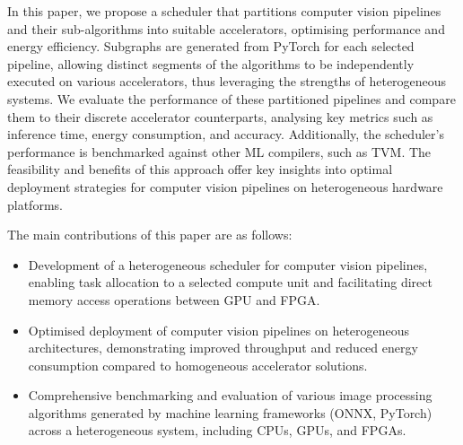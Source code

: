 \documentclass[]{spie}  %
\begin{document}
In this paper, we propose a scheduler that partitions computer vision pipelines and their sub-algorithms into suitable accelerators, optimising performance and energy efficiency. Subgraphs are generated from PyTorch for each selected pipeline, allowing distinct segments of the algorithms to be independently executed on various accelerators, thus leveraging the strengths of heterogeneous systems. We evaluate the performance of these partitioned pipelines and compare them to their discrete accelerator counterparts, analysing key metrics such as inference time, energy consumption, and accuracy. Additionally, the scheduler's performance is benchmarked against other ML compilers, such as TVM. The feasibility and benefits of this approach offer key insights into optimal deployment strategies for computer vision pipelines on heterogeneous hardware platforms.




The main contributions of this paper are as follows:
\begin{itemize}
\item Development of a heterogeneous scheduler for computer vision pipelines, enabling task allocation to a selected compute unit and facilitating direct memory access operations between GPU and FPGA.
\item Optimised deployment of computer vision pipelines on heterogeneous architectures, demonstrating improved throughput and reduced energy consumption compared to homogeneous accelerator solutions.
\item Comprehensive benchmarking and evaluation of various image processing algorithms generated by machine learning frameworks (ONNX, PyTorch) across a heterogeneous system, including CPUs, GPUs, and FPGAs.
\end{itemize}

\newpage
\end{document}
